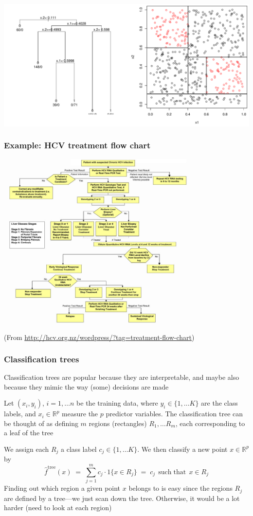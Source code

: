 \documentclass[mathserif]{beamer}
\def\R{\mathds{R}}
\def\red{\color[rgb]{0.8,0,0}}
\begin{document}
\begin{frame}
\frametitle{}
\bigskip
\includegraphics[width=\textwidth]{simpletree.pdf}
\end{frame}

\begin{frame}
\frametitle{Example: HCV treatment flow chart}
\smallskip
\begin{center}
\includegraphics[width=0.75\textwidth]{flowchart.jpg}
\end{center}
(From {\footnotesize \url{http://hcv.org.nz/wordpress/?tag=treatment-flow-chart}})
\end{frame}

\begin{frame}
\frametitle{Classification trees}
\smallskip
{\red Classification trees} are popular because they are 
interpretable, and maybe also because they mimic the way (some) decisions 
are made

\bigskip
Let $(x_i,y_i)$, $i=1,\ldots n$ be the training data, where 
$y_i \in \{1,\ldots K\}$ are the class labels, and 
$x_i \in \R^p$
measure the $p$ predictor variables. The classification tree can
be thought of as defining $m$ regions (rectangles) $R_1,\ldots R_m$, each 
corresponding to a leaf of the tree

\bigskip
We assign each $R_j$ a class label $c_j \in \{1,\ldots K\}$. We then 
classify a new point $x \in \R^p$ by
$$\hat{f}^\mathrm{tree}(x) \;=\; \sum_{j=1}^m c_j \cdot 1\{x \in R_j\}
\;=\; c_j \;\, \mathrm{such}\;\mathrm{that}\;\, x \in R_j$$
Finding out which region a given point $x$ belongs to is {\red easy} since
the regions $R_j$ are defined by a tree---we just scan down the tree.
Otherwise, it would be a lot harder (need to look at each region)
\end{frame}
\end{document}
